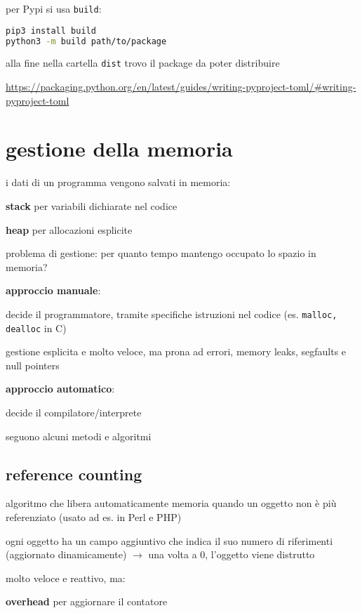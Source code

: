 per Pypi si usa \texttt{build}:

\begin{lstlisting}[language=bash]
pip3 install build
python3 -m build path/to/package
\end{lstlisting}

alla fine nella cartella \texttt{dist} trovo il package da poter distribuire

\href{https://packaging.python.org/en/latest/guides/writing-pyproject-toml/\#writing-pyproject-toml}{https://packaging.python.org/en/latest/guides/writing-pyproject-toml/\#writing-pyproject-toml}

\section{gestione della memoria}

i dati di un programma vengono salvati in memoria:

\textbf{stack} per variabili dichiarate nel codice

\textbf{heap} per allocazioni esplicite

problema di gestione: per quanto tempo mantengo occupato lo spazio in memoria?

\textbf{approccio manuale}:

decide il programmatore, tramite specifiche istruzioni nel codice (es. \texttt{malloc, dealloc} in C)

gestione esplicita e molto veloce, ma prona ad errori, memory leaks, segfaults e null pointers

\textbf{approccio automatico}:

decide il compilatore/interprete

seguono alcuni metodi e algoritmi

\subsection{reference counting}

algoritmo che libera automaticamente memoria quando un oggetto non \`e pi\`u referenziato (usato ad es. in Perl e PHP)

ogni oggetto ha un campo aggiuntivo che indica il suo numero di riferimenti (aggiornato dinamicamente) $\rightarrow$ una volta a 0, l'oggetto viene distrutto

molto veloce e reattivo, ma:

\textbf{overhead} per aggiornare il contatore

